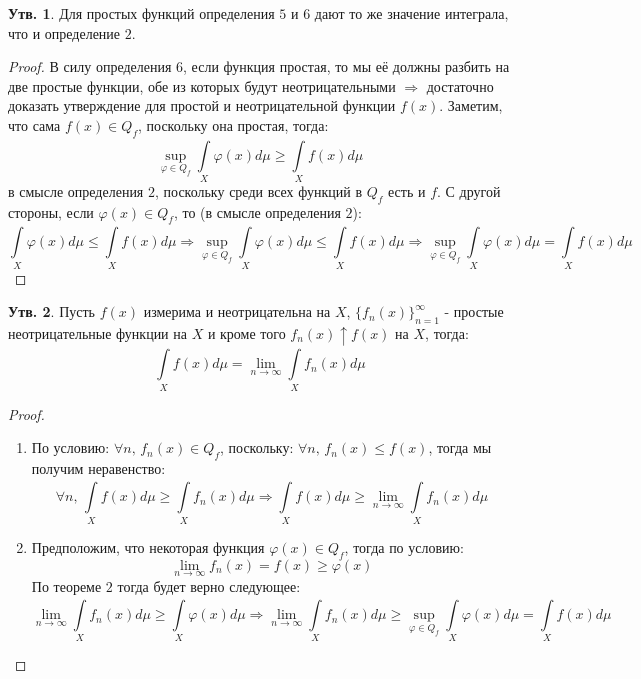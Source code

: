 \documentclass[12pt]{article}
\theoremstyle{definition}
\newtheorem{prop}{Утв.}
\newcommand{\ddint}[2]{\displaystyle\int\limits_{#1}^{#2}}
\begin{document}
\newpage
\begin{prop}
	Для простых функций определения $5$ и $6$ дают то же значение интеграла, что и определение $2$.
\end{prop}
\begin{proof}
	В силу определения $6$, если функция простая, то мы её должны разбить на две простые функции, обе из которых будут неотрицательными $\Rightarrow$ достаточно доказать утверждение для простой и неотрицательной функции $f(x)$. Заметим, что сама $f(x) \in Q_f$, поскольку она простая, тогда:
	$$ 
		\sup\limits_{\varphi \in Q_f}\ddint{X}{}\varphi(x)d\mu \geq \ddint{X}{}f(x) d\mu
	$$
	в смысле определения $2$, поскольку среди всех функций в $Q_f$ есть и $f$. С другой стороны, если $\varphi(x) \in Q_f$, то (в смысле определения $2$):
	$$
		\ddint{X}{}\varphi(x)d \mu \leq \ddint{X}{}f(x) d\mu \Rightarrow \sup\limits_{\varphi \in Q_f}\ddint{X}{}\varphi(x)d\mu \leq \ddint{X}{}f(x) d\mu \Rightarrow \sup\limits_{\varphi \in Q_f}\ddint{X}{}\varphi(x)d\mu = \ddint{X}{}f(x) d\mu
	$$
\end{proof}

\begin{prop}
	Пусть $f(x)$ измерима и неотрицательна на $X$, $\{f_n(x)\}_{n = 1}^{\infty}$ - простые неотрицательные функции на $X$ и кроме того $f_n(x) \uparrow f(x)$ на $X$, тогда:
	$$
		\ddint{X}{}f(x)d\mu = \lim\limits_{n \to \infty} \ddint{X}{}f_n(x)d\mu
	$$
\end{prop}
\begin{proof}\hfill
	\begin{enumerate}[label=\arabic*)]
		\item По условию: $\forall n, \, f_n(x) \in Q_f$, поскольку: $\forall n, \, f_n(x) \leq f(x)$, тогда мы получим неравенство:
		$$
			\forall n, \, \ddint{X}{}f(x)d\mu \geq \ddint{X}{}f_n(x)d\mu \Rightarrow \ddint{X}{}f(x)d\mu \geq \lim\limits_{n \to \infty}\ddint{X}{}f_n(x)d\mu 
		$$
		\item Предположим, что некоторая функция $\varphi(x) \in Q_f$, тогда по условию:
		$$
			\lim\limits_{n \to \infty}f_n(x) = f(x) \geq \varphi(x)
		$$
		По теореме $2$ тогда будет верно следующее:
		$$
			\lim\limits_{n \to \infty}\ddint{X}{}f_n(x)d\mu \geq \ddint{X}{}\varphi(x) d\mu \Rightarrow  \lim\limits_{n \to \infty}\ddint{X}{}f_n(x)d\mu \geq \sup\limits_{\varphi \in Q_f}\ddint{X}{}\varphi(x) d\mu = \ddint{X}{}f(x)d\mu
		$$
	\end{enumerate}
\end{proof}
\end{document}
